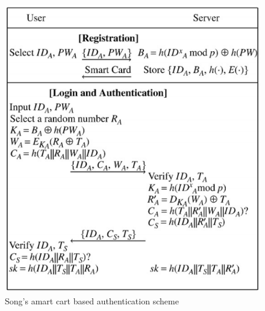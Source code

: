 \begin{CJK}{Bg5}{bsmi}
\begin{figure}
\centering
\includegraphics[scale=0.4]{picture/song-smart-card-scheme.png}
\caption{Song's amart cart based authentication scheme}
\label{fig:song-smard-card-scheme}
\end{figure}
\end{CJK}